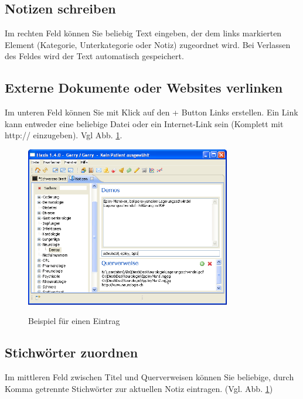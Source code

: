 \documentclass[a4paper]{scrartcl}
\begin{document}
\subsection{Notizen schreiben}
Im rechten Feld können Sie beliebig Text eingeben, der dem links markierten Element (Kategorie, Unterkategorie oder Notiz) zugeordnet wird. Bei Verlassen des Feldes wird der Text automatisch gespeichert.

\subsection{Externe Dokumente oder Websites verlinken}
Im unteren Feld können Sie mit Klick auf den + Button Links erstellen. Ein Link kann entweder eine beliebige Datei oder ein Internet-Link sein (Komplett mit http:// einzugeben). Vgl Abb. \ref{fig:notes3}.

\begin{figure}
  \includegraphics[width=0.8\textwidth]{notesview3}\\
  \caption{Beispiel für einen Eintrag}\label{fig:notes3}
\end{figure}

\subsection{Stichwörter zuordnen}
Im mittleren Feld zwischen Titel und Querverweisen können Sie beliebige, durch Komma getrennte Stichwörter zur aktuellen Notiz eintragen. (Vgl. Abb. \ref{fig:notes3})
\end{document}
